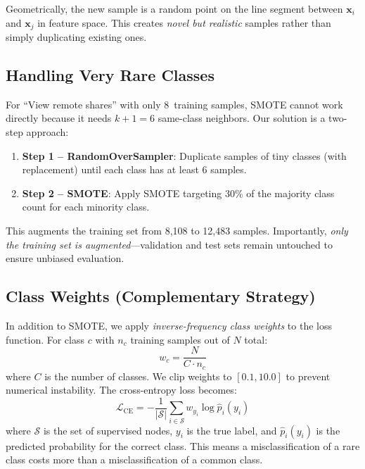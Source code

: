 \documentclass[conference]{IEEEtran}
\newcommand{\Loss}{\mathcal{L}}
\newcommand{\vect}[1]{\bm{#1}}
\DeclareMathOperator{\CE}{CE}
\begin{document}
Geometrically, the new sample is a random point on the line segment between $\vect{x}_i$ and $\vect{x}_j$ in feature space. This creates \emph{novel but realistic} samples rather than simply duplicating existing ones.

\subsection{Handling Very Rare Classes}

For ``View remote shares'' with only 8~training samples, SMOTE cannot work directly because it needs $k+1 = 6$ same-class neighbors. Our solution is a two-step approach:

\begin{enumerate}
    \item \textbf{Step 1 -- RandomOverSampler}: Duplicate samples of tiny classes (with replacement) until each class has at least 6 samples.
    \item \textbf{Step 2 -- SMOTE}: Apply SMOTE targeting 30\% of the majority class count for each minority class.
\end{enumerate}

This augments the training set from 8{,}108 to 12{,}483 samples. Importantly, \emph{only the training set is augmented}---validation and test sets remain untouched to ensure unbiased evaluation.

\subsection{Class Weights (Complementary Strategy)}

In addition to SMOTE, we apply \emph{inverse-frequency class weights} to the loss function. For class $c$ with $n_c$ training samples out of $N$ total:
\begin{equation}
    w_c = \frac{N}{C \cdot n_c}
\end{equation}
where $C$ is the number of classes. We clip weights to $[0.1, 10.0]$ to prevent numerical instability. The cross-entropy loss becomes:
\begin{equation}
    \Loss_{\CE} = -\frac{1}{|\mathcal{S}|} \sum_{i \in \mathcal{S}} w_{y_i} \log \hat{p}_i(y_i)
\end{equation}
where $\mathcal{S}$ is the set of supervised nodes, $y_i$ is the true label, and $\hat{p}_i(y_i)$ is the predicted probability for the correct class. This means a misclassification of a rare class costs more than a misclassification of a common class.
\end{document}
